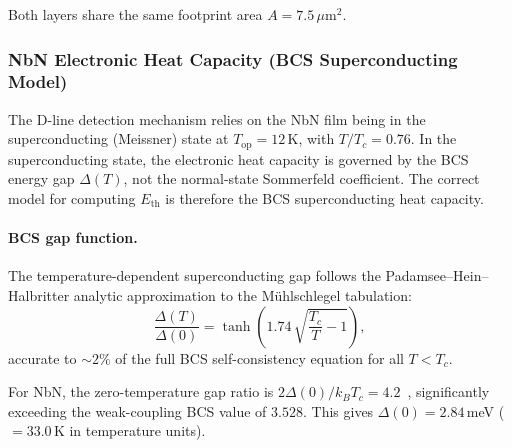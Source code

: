 \noindent Both layers share the same footprint area
$A = 7.5$\,$\mu$m$^2$.

\subsubsection{NbN Electronic Heat Capacity (BCS Superconducting Model)}
\label{sec:oq5_C_NbN}


The D-line detection mechanism relies on the NbN film being in the
superconducting (Meissner) state at $T_\mathrm{op} = 12$\,K, with
$T/T_c = 0.76$. In the superconducting state, the electronic heat
capacity is governed by the BCS energy gap $\Delta(T)$, not the
normal-state Sommerfeld coefficient. The correct model for computing
$E_\mathrm{th}$ is therefore the BCS superconducting heat capacity.

\paragraph{BCS gap function.}
The temperature-dependent superconducting gap follows the
Pad\-am\-see--Hein--Hal\-brit\-ter analytic approximation to the
M\"uhlschlegel tabulation:
\begin{equation}
  \frac{\Delta(T)}{\Delta(0)}
  = \tanh\!\left(1.74\,\sqrt{\frac{T_c}{T} - 1}\right),
  \label{eq:oq5_bcs_gap}
\end{equation}
accurate to $\sim\!2\%$ of the full BCS self-consistency
equation for all $T < T_c$.

For NbN, the zero-temperature gap ratio is
$2\Delta(0)/k_B T_c = 4.2$~\cite{Kamlapure2010},
significantly exceeding the weak-coupling BCS value of $3.528$.
This gives $\Delta(0) = 2.84$\,meV ($= 33.0$\,K in temperature
units). %


